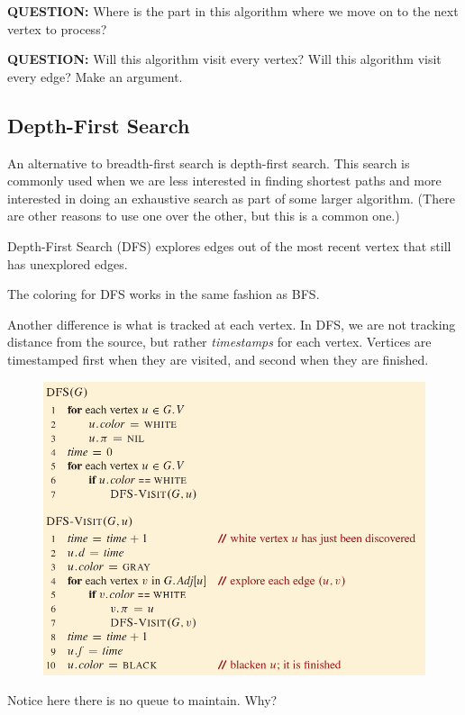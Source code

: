 \documentclass[12pt]{article}
\begin{document}
\textbf{QUESTION:} Where is the part in this algorithm where we move on to the next vertex to process? 

\textbf{QUESTION:} Will this algorithm visit every vertex? Will this algorithm visit every edge? Make an argument.

\subsection*{Depth-First Search}

An alternative to breadth-first search is depth-first search. This search is commonly used when we are less interested in finding shortest paths and more interested in doing an exhaustive search as part of some larger algorithm. (There are other reasons to use one over the other, but this is a common one.)

Depth-First Search (DFS) explores edges out of the most recent vertex that still has unexplored edges.

The coloring for DFS works in the same fashion as BFS. 

Another difference is what is tracked at each vertex. In DFS, we are not tracking distance from the source, but rather \textit{timestamps} for each vertex. Vertices are timestamped first when they are visited, and second when they are finished. 

\begin{figure}[h]
    \includegraphics[width=\textwidth]{dfs-pseudocode.png}
\end{figure}

Notice here there is no queue to maintain. Why?
\end{document}
